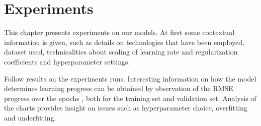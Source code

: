 \chapter{Experiments}
This chapter presents experiments on our models.
At first some contextual information is given, such as details on technologies that have
been employed, dataset used, technicalities about scaling of learning rate and regularization coefficients and hyperparameter settings.

Follow results on the experiments runs.
Interesting information on how the model determines learning progress
can be obtained by observation of the RMSE progress over the epochs , both for the
training set and validation set. 
Analysis of the charts provides insight on issues such as hyperparameter choice,
overfitting and underfitting.











